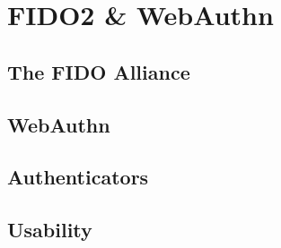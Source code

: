 
\section{FIDO2 \& WebAuthn}
\label{sec:results}

\subsection{The FIDO Alliance}
\label{subsec:fido_alliance}



\subsection{WebAuthn}
\label{subsec:webauthn}



\subsection{Authenticators}
\label{subsec:authenticators}


\subsection{Usability}
\label{subsec:usability}


